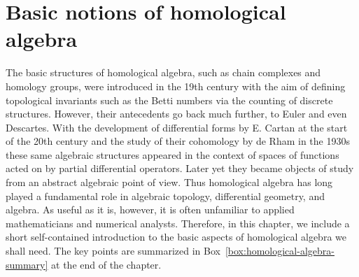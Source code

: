 \clearpage\setcounter{section}{1}
\section{{Basic notions of homological algebra}}\label{chap:homological-algebra}

{The basic structures of homological algebra, such as chain complexes and homology groups, were introduced in the 19th century with the aim of defining topological invariants such as the Betti numbers via the counting of discrete structures. However, their antecedents go back much further, to Euler and even Descartes. With the development of differential forms by E. Cartan at the start of the 20th century and the study of their cohomology by de Rham in the 1930s these same algebraic structures appeared in the context of spaces of functions acted on by partial differential operators. Later yet they became objects of study from an abstract algebraic point of view. Thus homological algebra has long played a fundamental role in algebraic topology, differential geometry, and algebra. As useful as it is, however, it is often unfamiliar to applied mathematicians and numerical analysts. Therefore, in this chapter, we include a short self-contained introduction to the basic aspects of homological algebra we shall need. The key points are summarized in Box~\ref{box:homological-algebra-summary} at the end of the chapter.}
